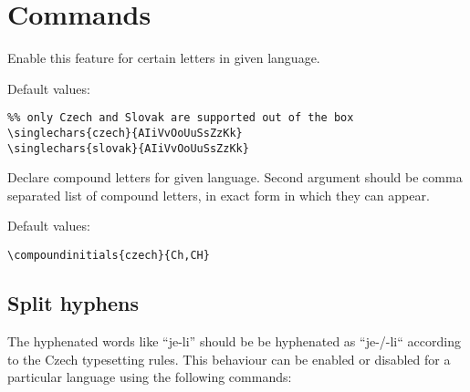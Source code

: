 \documentclass[12pt]{ltxdoc}
\newenvironment{mycode}{
	\medskip%
	\parindent=0pt%
}{\medskip}
\begin{document}
\section{Commands}

\begin{mycode}
\cmd{\singlechars} 
\end{mycode}

Enable this feature for certain letters in given language. 

Default values:

\begin{mycode}
\begin{verbatim}
%% only Czech and Slovak are supported out of the box
\singlechars{czech}{AIiVvOoUuSsZzKk}
\singlechars{slovak}{AIiVvOoUuSsZzKk}
\end{verbatim}
\end{mycode}


\begin{mycode}
\cmd{\compoundinitials}
\end{mycode}

Declare compound letters for given language. Second argument should be comma 
separated list of compound letters, in exact form in which they can appear.

Default values:

\begin{mycode}
\begin{verbatim}
\compoundinitials{czech}{Ch,CH}
\end{verbatim}
\end{mycode}


\subsection{Split hyphens}

The hyphenated words like ``je-li'' should be be hyphenated as ``je-/-li``
according to the Czech typesetting rules. This behaviour can be enabled or disabled for a particular
language using the following commands:

\begin{mycode}
  \cmd{\enablesplithyphens}\\
  \cmd{\disablesplithyphens}
\end{mycode}
\end{document}
